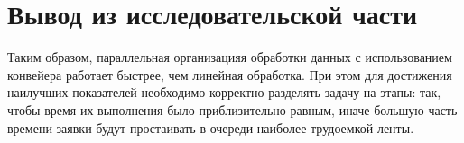 \section{Вывод из исследовательской части}

Таким образом, параллельная организацияя обработки данных с использованием конвейера  работает быстрее, чем линейная обработка. При этом для достижения наилучших показателей необходимо корректно разделять задачу на этапы: так, чтобы время их выполнения было приблизительно равным, иначе большую часть времени заявки будут простаивать в очереди наиболее трудоемкой ленты.